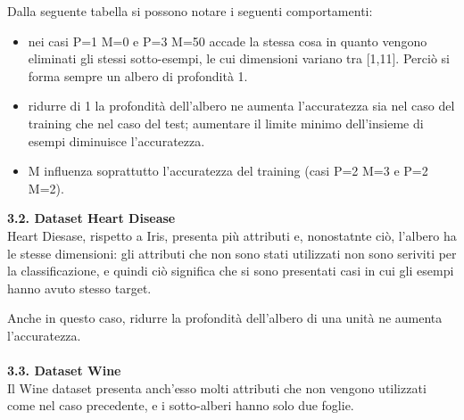 \documentclass{article}
\begin{document}
Dalla seguente tabella si possono notare i seguenti comportamenti:
\begin{itemize}
	\item nei casi P=1 M=0 e P=3 M=50 accade la stessa cosa in quanto vengono eliminati gli stessi sotto-esempi, le cui dimensioni variano tra [1,11]. Perciò si forma sempre un albero di profondità 1.
	\item ridurre di 1 la profondità dell'albero ne aumenta l'accuratezza sia nel caso del training che nel caso del test; aumentare il limite minimo dell'insieme di esempi diminuisce l'accuratezza.
	\item M influenza soprattutto l'accuratezza del training (casi P=2 M=3 e P=2 M=2).
\end{itemize}
{\Large \textbf{{\large{3}}.{\small{2}}. Dataset Heart Disease}}\\
Heart Diesase, rispetto a Iris, presenta più attributi e, nonostatnte ciò, l'albero ha le stesse dimensioni: gli attributi che non sono stati utilizzati non sono seriviti per la classificazione, e quindi ciò significa che si sono presentati casi in cui gli esempi hanno avuto stesso target.
\begin{table}[H]
\end{table}
Anche in questo caso, ridurre la profondità dell'albero di una unità ne aumenta l'accuratezza.\\
\\
{\Large \textbf{{\large{3}}.{\small{3}}. Dataset Wine}}\\
Il Wine dataset presenta anch'esso molti attributi che non vengono utilizzati come nel caso precedente, e i sotto-alberi hanno solo due foglie.
\end{document}
